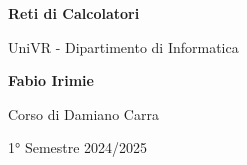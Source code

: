 \begin{titlepage}
	\begin{center}
		\vspace*{1cm}

		\Huge
    \textbf{Reti di Calcolatori}

		\vspace{0.5cm}
		\LARGE
		UniVR - Dipartimento di Informatica

		\vspace{1.5cm}

		\textbf{Fabio Irimie}

		\vfill


		\vspace{0.8cm}

    Corso di Damiano Carra

		1° Semestre 2024/2025

	\end{center}
\end{titlepage}
